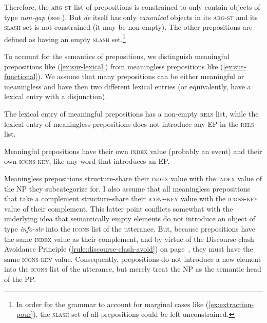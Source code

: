 Therefore, the \textsc{arg-st} list of prepositions is constrained to only contain objects of type \textit{non-gap} (see ). But \emph{de} itself has only \emph{canonical} objects in its \textsc{arg-st} and its \textsc{slash} set is not constrained (it may be non-empty). The other prepositions are defined as having an empty \textsc{slash} set.\footnote{In order for the grammar to account for marginal cases like (\ref{ex:extraction-pour}), the \textsc{slash} set of all prepositions could be left unconstrained.}

To account for the semantics of prepositions, we distinguish meaningful prepositions like (\ref{ex:sur-lexical}) from meaningless prepositions like (\ref{ex:sur-functional}). We assume that many prepositions can be either meaningful or meaningless and have then two different lexical entries (or equivalently, have a lexical entry with a disjunction). 

\eal 
{}
\label{ex:sur-lexical}
\label{ex:sur-functional}
\zl 

The lexical entry of meaningful prepositions has a non-empty \textsc{rels} list, while the lexical entry of meaningless prepositions does not introduce any EP in the \textsc{rels} list. 

Meaningful prepositions 
have their own \textsc{index} value (probably an event) and their own \textsc{icons-key}, like any word that introduces an EP.

Meaningless prepositions structure-share their \textsc{index} value with the \textsc{index} value of the NP they subcategorize for. 
I also assume that all meaningless prepositions that take a complement structure-share their \textsc{icons-key} value with the \textsc{icons-key} value of their complement. This latter point conflicts somewhat with the underlying idea that semantically empty elements do not introduce an object of type \emph{info-str} into the \textsc{icons} list of the utterance. But, because prepositions have the same \textsc{index} value as their complement, and by virtue of the Discourse-clash Avoidance Principle (\ref{rule:discourse-clash-avoid}) on page~\pageref{rule:discourse-clash-avoid}, they must have the same \textsc{icons-key} value. Consequently, prepositions do not introduce a new element into the \textsc{icons} list of the utterance, but merely treat the NP as the semantic head of the PP.\largerpage

